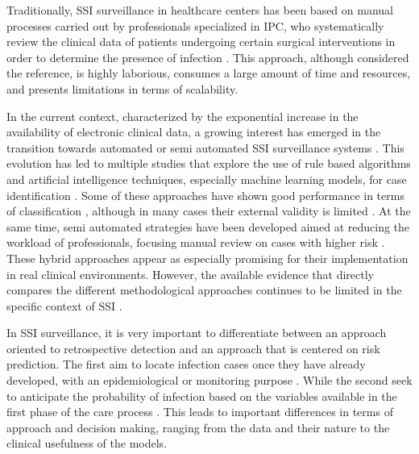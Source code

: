 \documentclass[12pt,onecolumn]{article}
\begin{document}
Traditionally, SSI surveillance in healthcare centers has been based on manual processes carried out by professionals specialized in IPC, who systematically review the clinical data of patients undergoing certain surgical interventions in order to determine the presence of infection \cite{4_intro_manual_diagnosis}. This approach, although considered the reference, is highly laborious, consumes a large amount of time and resources, and presents limitations in terms of scalability.

In the current context, characterized by the exponential increase in the availability of electronic clinical data, a growing interest has emerged in the transition towards automated or semi automated SSI surveillance systems \cite{5_automated_surveillance,13_prognostic_model_SSI,16_ai_models_review}. This evolution has led to multiple studies that explore the use of rule based algorithms and artificial intelligence techniques, especially machine learning models, for case identification \cite{16_ai_models_review,20_rule_based_models,21_semi_automated_surveillance}. Some of these approaches have shown good performance in terms of classification \cite{22_automated_detection_SSI,23_automated_detection_SSI,24_predictive_model_SSI}, although in many cases their external validity is limited \cite{25_intro_external_validation}. At the same time, semi automated strategies have been developed aimed at reducing the workload of professionals, focusing manual review on cases with higher risk \cite{20_rule_based_models,21_semi_automated_surveillance,26_intro_semi_automated_review}. These hybrid approaches appear as especially promising for their implementation in real clinical environments. However, the available evidence that directly compares the different methodological approaches continues to be limited in the specific context of SSI \cite{26_intro_semi_automated_review}.

In SSI surveillance, it is very important to differentiate between an approach oriented to retrospective detection and an approach that is centered on risk prediction. The first aim to locate infection cases once they have already developed, with an epidemiological or monitoring purpose \cite{intro_detection_SSI}. While the second seek to anticipate the probability of infection based on the variables available in the first phase of the care process \cite{intro_prediction_SSI}. This leads to important differences in terms of approach and decision making, ranging from the data and their nature to the clinical usefulness of the models.
\end{document}
